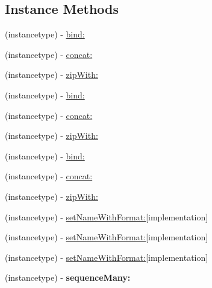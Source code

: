 \subsection*{Instance Methods}
\begin{DoxyCompactItemize}
\item 
(instancetype) -\/ \mbox{\hyperlink{interface_r_a_c_stream_a8638bfba1497aa1b14b098857b4c62e2}{bind\+:}}
\item 
(instancetype) -\/ \mbox{\hyperlink{interface_r_a_c_stream_aa6ba0c467e804ce813a0c6b627043ec3}{concat\+:}}
\item 
(instancetype) -\/ \mbox{\hyperlink{interface_r_a_c_stream_a6d06fc682aaa557fbe33af0658988618}{zip\+With\+:}}
\item 
(instancetype) -\/ \mbox{\hyperlink{interface_r_a_c_stream_a8638bfba1497aa1b14b098857b4c62e2}{bind\+:}}
\item 
(instancetype) -\/ \mbox{\hyperlink{interface_r_a_c_stream_aa6ba0c467e804ce813a0c6b627043ec3}{concat\+:}}
\item 
(instancetype) -\/ \mbox{\hyperlink{interface_r_a_c_stream_a6d06fc682aaa557fbe33af0658988618}{zip\+With\+:}}
\item 
(instancetype) -\/ \mbox{\hyperlink{interface_r_a_c_stream_a8638bfba1497aa1b14b098857b4c62e2}{bind\+:}}
\item 
(instancetype) -\/ \mbox{\hyperlink{interface_r_a_c_stream_aa6ba0c467e804ce813a0c6b627043ec3}{concat\+:}}
\item 
(instancetype) -\/ \mbox{\hyperlink{interface_r_a_c_stream_a6d06fc682aaa557fbe33af0658988618}{zip\+With\+:}}
\item 
(instancetype) -\/ \mbox{\hyperlink{interface_r_a_c_stream_aedc0b75ca3e6d0f81f006c7c3c6a1d76}{set\+Name\+With\+Format\+:}}{\ttfamily  \mbox{[}implementation\mbox{]}}
\item 
(instancetype) -\/ \mbox{\hyperlink{interface_r_a_c_stream_aedc0b75ca3e6d0f81f006c7c3c6a1d76}{set\+Name\+With\+Format\+:}}{\ttfamily  \mbox{[}implementation\mbox{]}}
\item 
(instancetype) -\/ \mbox{\hyperlink{interface_r_a_c_stream_aedc0b75ca3e6d0f81f006c7c3c6a1d76}{set\+Name\+With\+Format\+:}}{\ttfamily  \mbox{[}implementation\mbox{]}}
\item 
\mbox{\label{interface_r_a_c_stream_a4c7538547d03c835dbe8fa457cfe9312}} 
(instancetype) -\/ {\bfseries sequence\+Many\+:}
\item 
\mbox{\label{interface_r_a_c_stream_a4c7538547d03c835dbe8fa457cfe9312}} 

\end{DoxyCompactItemize}
